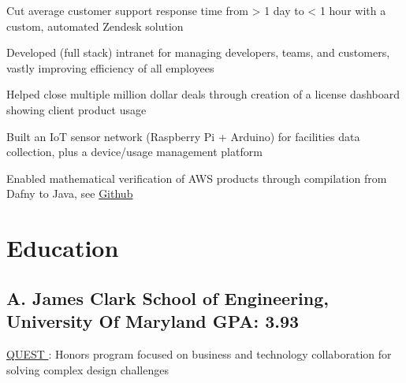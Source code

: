\documentclass[print]{jack-resume}
\begin{document}
\begin{tightemize}
    \item Cut average customer support response time from > 1 day to < 1 hour with a custom, automated Zendesk solution
    \item Developed (full stack) intranet for managing developers, teams, and customers, vastly improving efficiency of all employees
    \item Helped close multiple million dollar deals through creation of a license dashboard showing client product usage
\end{tightemize}
\sectionsep

\begin{tightemize}
    \item Built an IoT sensor network (Raspberry Pi + Arduino) for facilities data collection, plus a device/usage management platform
\end{tightemize}

\begin{tightemize}
    \item Enabled mathematical verification of AWS products through compilation from Dafny to Java, see \href{https://github.com/dafny-lang/dafny}{Github \ExternalLink}
\end{tightemize}
\sectionsep

\section{Education}
\subsection{A. James Clark School of Engineering, University Of Maryland \hfill GPA: 3.93}
 \hfill
\begin{tightemize}
    \item \color{darkmodePrimary}\href{https://www.rhsmith.umd.edu/programs/undergraduate-programs/academics/fellows-special-programs/quest}{QUEST \ExternalLink}: Honors program focused on business and technology collaboration for solving complex design challenges
\end{tightemize}

\begin{minipage}[t]{0.04\textwidth}
    \hfill
\end{minipage}
\end{document}
